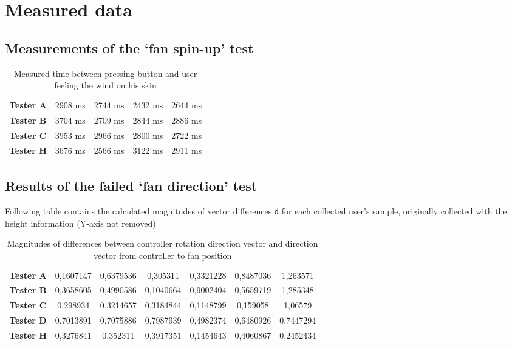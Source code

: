 \chapter{Measured data}\label{measured}

\section{Measurements of the `fan spin-up' test}\label{measured:a}

\begin{table}
\centering
\begin{tabular}{|c|c|c|c|c|}
    \hline
    \textbf{Tester A} & 2908 ms & 2744 ms & 2432 ms & 2644 ms \\
    \textbf{Tester B} & 3704 ms & 2709 ms & 2844 ms & 2886 ms \\
    \textbf{Tester C} & 3953 ms & 2966 ms & 2800 ms & 2722 ms \\
    \textbf{Tester H} & 3676 ms & 2566 ms & 3122 ms & 2911 ms \\
    \hline
\end{tabular}
\caption{Measured time between pressing button and user feeling the wind on his skin}
\end{table}

\section{Results of the failed `fan direction' test}\label{measured:b}
Following table contains the calculated magnitudes of vector differences \texttt{d}
for each collected user’s sample, originally collected with the
height information (Y-axis not removed)

\begin{table}
\centering
\begin{tabular}{|c|c|c|c|c|c|c|}
\hline
\textbf{Tester A} & 0,1607147 & 0,6379536 & 0,305311 & 0,3321228 & 0,8487036 & 1,263571 \\ 
\textbf{Tester B} & 0,3658605 & 0,4990586 & 0,1040664 & 0,9002404 & 0,5659719 & 1,285348 \\ 
\textbf{Tester C} & 0,298934 & 0,3214657 & 0,3184844 & 0,1148799 & 0,159058 & 1,06579 \\ 
\textbf{Tester D} & 0,7013891 & 0,7075886 & 0,7987939 & 0,4982374 & 0,6480926 & 0,7447294 \\ 
\textbf{Tester H} & 0,3276841 & 0,352311 & 0,3917351 & 0,1454643 & 0,4060867 & 0,2452434 \\ 
\hline
\end{tabular}
\caption{Magnitudes of differences between controller rotation direction vector and direction vector from controller to fan position}
\end{table}

